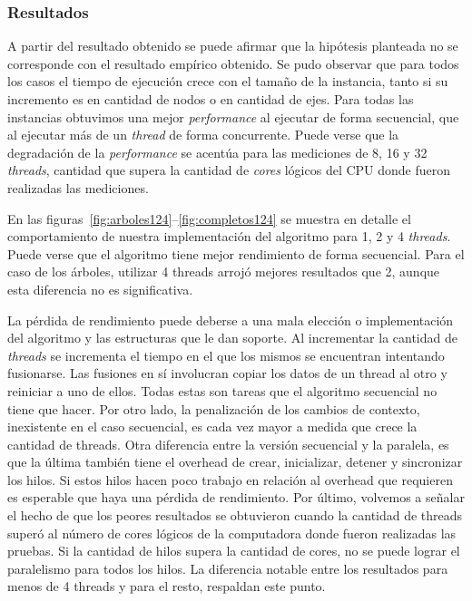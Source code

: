 \subsubsection{Resultados}
A partir del resultado obtenido se puede afirmar que la hipótesis planteada no 
se corresponde con el resultado empírico obtenido.
Se pudo observar que para todos los casos el tiempo de ejecución crece con el
tamaño de la instancia, tanto si su incremento es en cantidad de nodos o en
cantidad de ejes.
Para todas las instancias obtuvimos una mejor
\textit{performance} al ejecutar de forma secuencial, que al ejecutar más de un
\textit{thread} de forma
concurrente.
Puede verse que la degradación de la \textit{performance} se acentúa para las
mediciones de 8, 16 y 32 \textit{threads}, cantidad que supera la cantidad de
\textit{cores} lógicos del CPU donde fueron realizadas las mediciones.

En las figuras~\ref{fig:arboles124}--\ref{fig:completos124} se muestra en
detalle el comportamiento de nuestra implementación del algoritmo para 1, 2 y 4
\textit{threads}. Puede verse que el algoritmo tiene mejor rendimiento de forma
secuencial. Para el caso de los árboles, utilizar 4 threads arrojó
mejores resultados que 2, aunque esta diferencia no es significativa.

La pérdida de rendimiento puede deberse a una mala elección o implementación
del algoritmo y las estructuras que le dan soporte. Al incrementar la 
cantidad de \textit{threads} se incrementa el tiempo en el que los mismos se
 encuentran intentando fusionarse. Las fusiones en sí involucran copiar los 
 datos de un thread al otro y reiniciar a uno de ellos. Todas estas son tareas 
 que el algoritmo secuencial no tiene que hacer. Por otro lado, la penalización
  de los cambios de contexto, inexistente en el caso secuencial, es cada vez 
  mayor a medida que crece la cantidad de threads.
  Otra diferencia entre la versión secuencial y la paralela, es que la última 
  también tiene el overhead de crear, inicializar, detener y sincronizar los 
  hilos. Si estos hilos hacen poco trabajo en relación al overhead que 
  requieren es esperable que haya una pérdida de rendimiento. Por último, 
  volvemos a señalar el hecho de que los peores resultados se obtuvieron 
  cuando la cantidad de threads superó al número de cores lógicos de la 
  computadora donde fueron realizadas las pruebas. Si la cantidad de hilos 
  supera la cantidad de cores, no se puede lograr el paralelismo para todos 
  los hilos. La diferencia notable entre los resultados para menos de 4 threads
   y para el resto, respaldan este punto.


